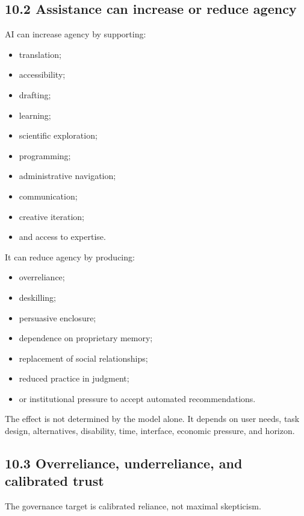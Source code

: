\documentclass[
  11pt,
]{article}
\providecommand{\tightlist}{%
  \setlength{\itemsep}{0pt}\setlength{\parskip}{0pt}}
\begin{document}
\subsection{10.2 Assistance can increase or reduce
agency}\label{assistance-can-increase-or-reduce-agency}

AI can increase agency by supporting:

\begin{itemize}
\tightlist
\item
  translation;
\item
  accessibility;
\item
  drafting;
\item
  learning;
\item
  scientific exploration;
\item
  programming;
\item
  administrative navigation;
\item
  communication;
\item
  creative iteration;
\item
  and access to expertise.
\end{itemize}

It can reduce agency by producing:

\begin{itemize}
\tightlist
\item
  overreliance;
\item
  deskilling;
\item
  persuasive enclosure;
\item
  dependence on proprietary memory;
\item
  replacement of social relationships;
\item
  reduced practice in judgment;
\item
  or institutional pressure to accept automated recommendations.
\end{itemize}

The effect is not determined by the model alone. It depends on user
needs, task design, alternatives, disability, time, interface, economic
pressure, and horizon.

\subsection{10.3 Overreliance, underreliance, and calibrated
trust}\label{overreliance-underreliance-and-calibrated-trust}

The governance target is calibrated reliance, not maximal skepticism.
\end{document}

